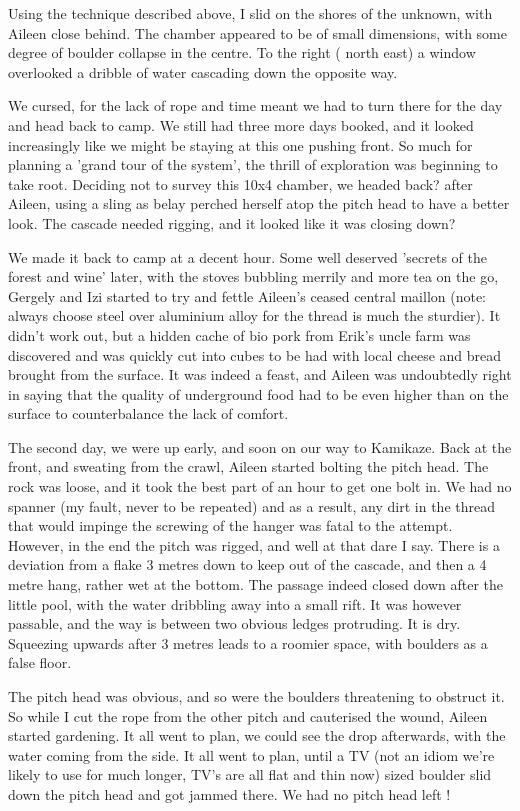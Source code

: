 \documentclass[onecolumn]{book}
\begin{document}
Using the technique described above, I slid on the shores of the unknown, with Aileen close behind. The chamber appeared to be of small dimensions, with some degree of boulder collapse in the centre. To the right ( north east) a window overlooked a dribble of water cascading down the opposite way.

We cursed, for the lack of rope and time meant we had to turn there for the day and head back to camp. We still had three more days booked, and it looked increasingly like we might be staying at this one pushing front. So much for planning a 'grand tour of the system', the thrill of exploration was beginning to take root. Deciding not to survey this 10x4 chamber, we headed back? after Aileen, using a sling as belay perched herself atop the pitch head to have a better look. The cascade needed rigging, and it looked like it was closing down?

We made it back to camp at a decent hour. Some well deserved 'secrets of the forest and wine' later, with the stoves bubbling merrily and more tea on the go, Gergely and Izi started to try and fettle Aileen's ceased central maillon (note: always choose steel over aluminium alloy for the thread is much the sturdier). It didn't work out, but a hidden cache of bio pork from Erik's uncle farm was discovered and was quickly cut into cubes to be had with local cheese and bread brought from the surface. It was indeed a feast, and Aileen was undoubtedly right in saying that the quality of underground food had to be even higher than on the surface to counterbalance the lack of comfort.

The second day, we were up early, and soon on our way to Kamikaze. Back at the front, and sweating from the crawl, Aileen started bolting the pitch head. The rock was loose, and it took the best part of an hour to get one bolt in. We had no spanner (my fault, never to be repeated) and as a result, any dirt in the thread that would impinge the screwing of the hanger was fatal to the attempt. However, in the end the pitch was rigged, and well at that dare I say. There is a deviation from a flake 3 metres down to keep out of the cascade, and then a 4 metre hang, rather wet at the bottom. The passage indeed closed down after the little pool, with the water dribbling away into a small rift. It was however passable, and the way is between two obvious ledges protruding. It is dry. Squeezing upwards after 3 metres leads to a roomier space, with boulders as a false floor.

The pitch head was obvious, and so were the boulders threatening to obstruct it. So while I cut the rope from the other pitch and cauterised the wound, Aileen started gardening. It all went to plan, we could see the drop afterwards, with the water coming from the side. It all went to plan, until a TV (not an idiom we're likely to use for much longer, TV's are all flat and thin now) sized boulder slid down the pitch head and got jammed there. We had no pitch head left !
\end{document}
